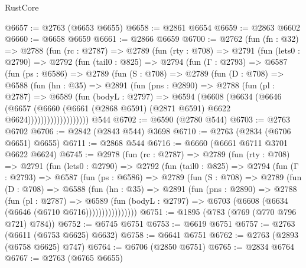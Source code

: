 \begin{lexlean}{RustCore}
\begin{coremodule}
@6657 := @2763 (@6653 @6655)
@6658 := @2861 @6654
@6659 := @2863 @6602
@6660 := @6658 @6659
@6661 := @2866 @6659
@6700 := @2762
    (fun (fn : @32) =>
    @2788
      (fun (rc : @2787) =>
      @2789
        (fun (rty : @708) =>
        @2791
          (fun (lets0 : @2790) =>
          @2792
            (fun (tail0 : @825) =>
            @2794
              (fun (Γ : @2793) =>
              @6587
                (fun (ps : @6586) =>
                @2789
                  (fun (S : @708) =>
                  @2789
                    (fun (D : @708) =>
                    @6588
                      (fun (hn : @35) =>
                      @2891
                        (fun (pns : @2890) =>
                        @2788
                          (fun (pl : @2787) =>
                          @6589
                            (fun (bodyL : @2797) =>
                            @6594
                              (@6608
                                (@6634
                                  (@6646
                                    (@6657
                                      (@6660
                                        (@6661
                                          (@2868 @6591)
                                          (@2871 @6591)
                                          @6622
                                          @6624)))))))))))))))))))
    @544
@6702 := @6590 (@2780 @544)
@6703 := @2763 @6702
@6706 := @2842 (@2843 @544) @3698
@6710 := @2763 (@2834 (@6706 @6651) @6655)
@6711 := @2868 @544
@6716 := @6660 (@6661 @6711 @3701 @6622 @6624)
@6745 := @2978
    (fun (rc : @2787) =>
    @2789
      (fun (rty : @708) =>
      @2791
        (fun (lets0 : @2790) =>
        @2792
          (fun (tail0 : @825) =>
          @2794
            (fun (Γ : @2793) =>
            @6587
              (fun (ps : @6586) =>
              @2789
                (fun (S : @708) =>
                @2789
                  (fun (D : @708) =>
                  @6588
                    (fun (hn : @35) =>
                    @2891
                      (fun (pns : @2890) =>
                      @2788
                        (fun (pl : @2787) =>
                        @6589
                          (fun (bodyL : @2797) =>
                          @6703 (@6608 (@6634 (@6646 (@6710 @6716))))))))))))))))
@6751 := @1895 (@783 (@769 (@770 @796 @721) @784))
@6752 := @6745 @6751
@6753 := @6619 @6751
@6757 := @2763 (@6611 (@6753 @6625) @6632)
@6758 := @6641 @6751
@6762 := @2763 (@2893 (@6758 @6625) @747)
@6764 := @6706 (@2850 @6751)
@6765 := @2834 @6764
@6767 := @2763 (@6765 @6655)

\end{coremodule}
\end{lexlean}
